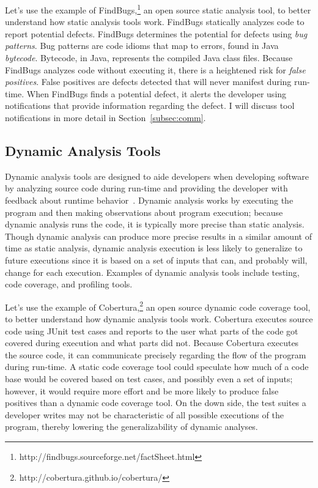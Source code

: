 Let's use the example of FindBugs,\footnote{http://findbugs.sourceforge.net/factSheet.html} an open source static analysis tool, to better understand how static analysis tools work. FindBugs statically analyzes code to report potential defects. FindBugs determines the potential for defects using \emph{bug patterns}. Bug patterns are code idioms that map to errors, found in Java \emph{bytecode}. Bytecode, in Java, represents the compiled Java class files. Because FindBugs analyzes code without executing it, there is a heightened risk for \emph{false positives}. False positives are defects detected that will never manifest during run-time. When FindBugs finds a potential defect, it alerts the developer using notifications that provide information regarding the defect. I will discuss tool notifications in more detail in Section~\ref{subsec:comm}.


\subsection{Dynamic Analysis Tools}

Dynamic analysis tools are designed to aide developers when developing software by analyzing source code during run-time and providing the developer with feedback about runtime behavior~\cite{ernst2003static}.
Dynamic analysis works by executing the program and then making observations about program execution; because dynamic analysis runs the code, it is typically more precise than static analysis. Though dynamic analysis can produce more precise results in a similar amount of time as static analysis, dynamic analysis execution is less likely to generalize to future executions since it is based on a set of inputs that can, and probably will, change for each execution.
Examples of dynamic analysis tools include testing, code coverage, and profiling tools.

Let's use the example of Cobertura,\footnote{http://cobertura.github.io/cobertura/} an open source dynamic code coverage tool, to better understand how dynamic analysis tools work. Cobertura executes source code using JUnit test cases and reports to the user what parts of the code got covered during execution and what parts did not. Because Cobertura executes the source code, it can communicate precisely regarding the flow of the program during run-time. A static code coverage tool could speculate how much of a code base would be covered based on test cases, and possibly even a set of inputs; however, it would require more effort and be more likely to produce false positives than a dynamic code coverage tool. On the down side, the test suites a developer writes may not be characteristic of all possible executions of the program, thereby lowering the generalizability of dynamic analyses.

